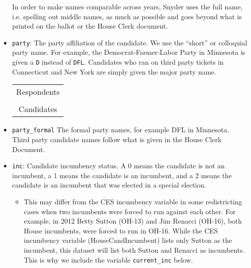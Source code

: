 \documentclass[12pt]{article}
\begin{document}
\begin{itemize}[leftmargin=*]
In order to make names comparable across years, Snyder uses the full name, i.e. spelling out middle names, as much as possible and goes beyond what is printed on the ballot or the House Clerk document.

\item \texttt{party}: The party affiliation of the candidate. We use the ``short'' or colloquial party name. For example, the Democrat-Farmer-Labor Party in Minnesota is given a \texttt{D} instead of \texttt{DFL}. Candidates who ran on third party tickets in Connecticut and New York are simply given the major party name.   %



\begin{tabularx}{\linewidth}{C}
  Respondents\\
  \\\addlinespace
  Candidates\\
  
\end{tabularx}

\item \texttt{party\_formal} The formal party names, for example DFL in Minnesota. Third party candidate names follow what is given in the House Clerk Document. 

\item \texttt{inc}: Candidate incumbency status. A 0 means the candidate is not an incumbent, a 1 means the candidate is an incumbent, and a 2 means the candidate is an incumbent that was elected in a special election. 
\begin{itemize}
\item This may differ from the CES incumbency variable in some redistricting cases when two incumbents were forced to run against each other. For example, in 2012 Betty Sutton (OH-13) and Jim Renacci (OH-16), both House incumbents, were forced to run in OH-16. While the CES incumbency variable (HouseCandIncumbent) lists only Sutton as the incumbent, this dataset will list both Sutton and Renacci as incumbents. This is why we include the variable  \texttt{current\_inc} below.  
\end{itemize}


\end{itemize}
\end{document}

